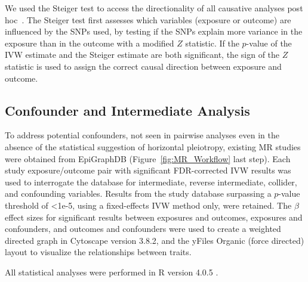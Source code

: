 \documentclass[genes,article,accept,moreauthors,pdftex]{Definitions/mdpi}
\begin{document}
We used the Steiger test to access the directionality of all causative analyses post hoc~\cite{hemani_orienting_2017}. The Steiger test first assesses which variables (exposure or outcome) are influenced by the SNPs used, by testing if the SNPs explain more variance in the exposure than in the outcome with a modified $Z$ statistic. If the $p$-value of the IVW estimate and the Steiger estimate are both significant, the sign of the $Z$ statistic is used to assign the correct causal direction between exposure and outcome.

\subsection{Confounder and Intermediate Analysis}
To address potential confounders, not seen in pairwise analyses even in the absence of the statistical suggestion of horizontal pleiotropy, existing MR studies were obtained from EpiGraphDB (Figure~\ref{fig:MR_Workflow} last step). Each study exposure/outcome pair with significant FDR-corrected IVW results was used to interrogate the database for intermediate, reverse intermediate, collider, and confounding variables. Results from the study database surpassing a $p$-value threshold of <1e-5, using a fixed-effects IVW method only, were retained. The $\beta$ effect sizes for significant results between exposures and outcomes, exposures and confounders, and outcomes and confounders were used to create a weighted directed graph in Cytoscape \cite{shannon_cytoscape_2003} version 3.8.2, and the yFiles Organic (force directed) layout to visualize the relationships between traits. 

All statistical analyses were performed in R version 4.0.5 \cite{r_core_team_r:_2013}. 


\end{document}
